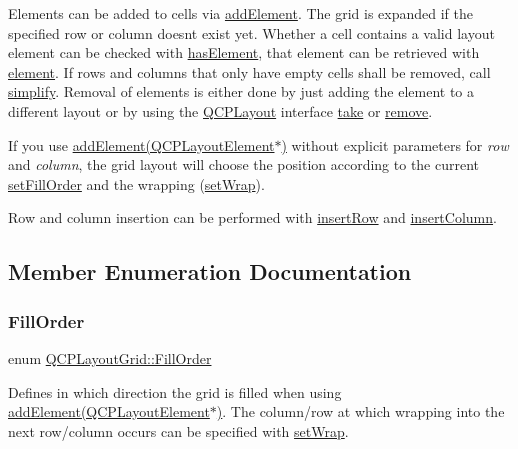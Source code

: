 Elements can be added to cells via \hyperlink{classQCPLayoutGrid_adff1a2ca691ed83d2d24a4cd1fe17012}{add\+Element}. The grid is expanded if the specified row or column doesn\textquotesingle{}t exist yet. Whether a cell contains a valid layout element can be checked with \hyperlink{classQCPLayoutGrid_ab0cf4f7edc9414a3bfaddac0f46dc0a0}{has\+Element}, that element can be retrieved with \hyperlink{classQCPLayoutGrid_a602b426609b4411cf6a93c3ddf3a381a}{element}. If rows and columns that only have empty cells shall be removed, call \hyperlink{classQCPLayoutGrid_a38621ca7aa633b6a9a88617df7f08672}{simplify}. Removal of elements is either done by just adding the element to a different layout or by using the \hyperlink{classQCPLayout}{Q\+C\+P\+Layout} interface \hyperlink{classQCPLayoutGrid_aee961c2eb6cf8a85dcbc5a7d7b6c1a00}{take} or \hyperlink{classQCPLayout_a6c58f537d8086f352576ab7c5b15d0bc}{remove}.

If you use \hyperlink{classQCPLayoutGrid_a4c44025dd25acd27e053cadfd448ad7b}{add\+Element(\+Q\+C\+P\+Layout\+Element$\ast$)} without explicit parameters for {\itshape row} and {\itshape column}, the grid layout will choose the position according to the current \hyperlink{classQCPLayoutGrid_affc2f3cfd22f28698c5b29b960d2a391}{set\+Fill\+Order} and the wrapping (\hyperlink{classQCPLayoutGrid_ab36af18d77e4428386d02970382ee598}{set\+Wrap}).

Row and column insertion can be performed with \hyperlink{classQCPLayoutGrid_a48af3dd7c3a653d9c3d7dd99bd02e838}{insert\+Row} and \hyperlink{classQCPLayoutGrid_a1e880a321dbe8b43b471ccd764433dc4}{insert\+Column}. 

\subsection{Member Enumeration Documentation}
\mbox{\label{classQCPLayoutGrid_a7d49ee08773de6b2fd246edfed353cca}} 
\subsubsection{\texorpdfstring{Fill\+Order}{FillOrder}}
{\footnotesize\ttfamily enum \hyperlink{classQCPLayoutGrid_a7d49ee08773de6b2fd246edfed353cca}{Q\+C\+P\+Layout\+Grid\+::\+Fill\+Order}}

Defines in which direction the grid is filled when using \hyperlink{classQCPLayoutGrid_a4c44025dd25acd27e053cadfd448ad7b}{add\+Element(\+Q\+C\+P\+Layout\+Element$\ast$)}. The column/row at which wrapping into the next row/column occurs can be specified with \hyperlink{classQCPLayoutGrid_ab36af18d77e4428386d02970382ee598}{set\+Wrap}.

